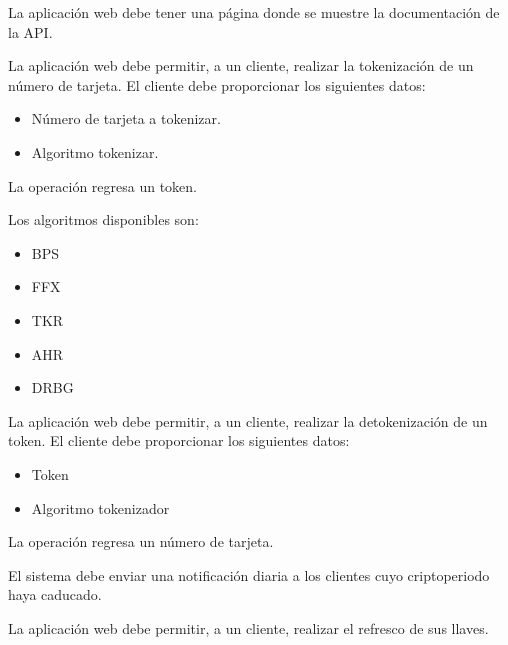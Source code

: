 {
  La aplicación web debe tener una página donde se muestre la documentación de la
  API.
}

{
  La aplicación web debe permitir, a un cliente, realizar la tokenización de un
  número de tarjeta. El cliente debe proporcionar los siguientes datos:
  \begin{itemize}
    \item Número de tarjeta a tokenizar.
    \item Algoritmo tokenizar.
  \end{itemize}
  La operación regresa un token.

  \begin{hangparas}{2em}{0}
    Los algoritmos disponibles son:
  \end{hangparas}
  \begin{itemize}
    \item BPS
    \item FFX
    \item TKR
    \item AHR
    \item DRBG
  \end{itemize}
}

{
  La aplicación web debe permitir, a un cliente, realizar la detokenización de
  un token. El cliente debe proporcionar los siguientes datos:
  \begin{itemize}
    \item Token
    \item Algoritmo tokenizador
  \end{itemize}
  La operación regresa un número de tarjeta.
}

{
  El sistema debe enviar una notificación diaria a los clientes cuyo
  criptoperiodo haya caducado.
}

{
  La aplicación web debe permitir, a un cliente, realizar el refresco de sus
  llaves.
}
